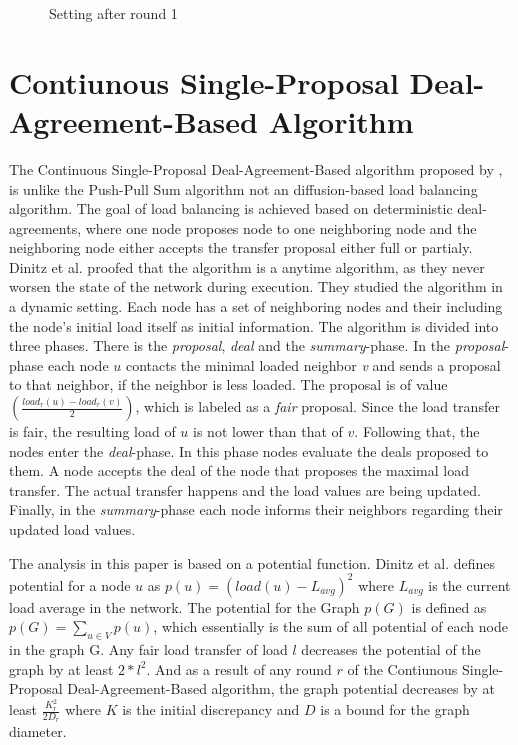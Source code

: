 \begin{figure}
    \centering
    
    \caption{Setting after round 1}
    \label{fig:examplePPSResult}
\end{figure}

\section{Contiunous Single-Proposal Deal-Agreement-Based Algorithm}\label{sec:singleproposalDAB}
The Continuous Single-Proposal Deal-Agreement-Based algorithm proposed by \cite{Dinitz2023DAB}, is unlike the Push-Pull Sum algorithm not an diffusion-based load balancing algorithm. The goal of load balancing is achieved based on deterministic deal-agreements, where one node proposes node to one neighboring node and the neighboring node either accepts the transfer proposal either full or partialy. Dinitz et al. proofed that the algorithm is a anytime algorithm, as they never worsen the state of the network during execution. They studied the algorithm in a dynamic setting. Each node has a set of neighboring nodes and their including the node's initial load itself as initial information. The algorithm is divided into three phases. There is the \textit{proposal}, \textit{deal} and the \textit{summary}-phase. In the \textit{proposal}-phase each node $u$ contacts the minimal loaded neighbor \textit{v} and sends a proposal to that neighbor, if the neighbor is less loaded. The proposal is of value $(\frac{load_{r}(u)-load_{r}(v)}{2})$, which is labeled as a \textit{fair} proposal. Since the load transfer is fair, the resulting load of $u$ is not lower than that of $v$. Following that, the nodes enter the \textit{deal}-phase. In this phase nodes evaluate the deals proposed to them. A node accepts the deal of the node that proposes the maximal load transfer. The actual transfer happens and the load values are being updated. Finally, in the \textit{summary}-phase each node informs their neighbors regarding their updated load values. \cite{Dinitz2023DAB}


The analysis in this paper is based on a potential function. Dinitz et al. defines potential for a node $u$ as $p(u) = (load(u)-L_{avg})^{2}$ where $L_{avg}$ is the current load average in the network. The potential for the Graph $p(G)$ is defined as $p(G)=\sum_{u\in V}{p(u)}$, which essentially is the sum of all potential of each node in the graph G. Any fair load transfer of load $l$ decreases the potential of the graph by at least $2*l^{2}$. And as a result of any round $r$ of the Contiunous Single-Proposal Deal-Agreement-Based algorithm, the graph potential decreases by at least $\frac{K^{2}_r}{2D_r}$ where $K$ is the initial discrepancy and $D$ is a bound for the graph diameter. \cite{Dinitz2023DAB}

